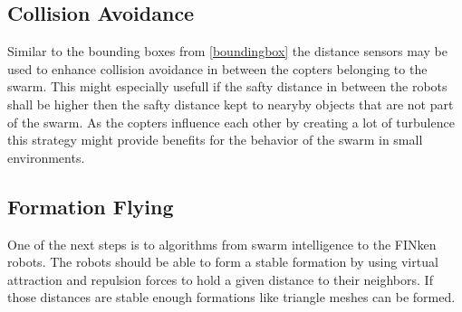 \subsection{Collision Avoidance}
Similar to the bounding boxes from \autoref{boundingbox} the distance sensors may be used to enhance collision avoidance in between the copters belonging to the swarm.
This might especially usefull if the safty distance in between the robots shall be higher then the safty distance kept to nearyby objects that are not part of the swarm.
As the copters influence each other by creating a lot of turbulence this strategy might provide benefits for the behavior of the swarm in small environments.

\subsection{Formation Flying}
One of the next steps is to  algorithms from swarm intelligence to the FINken robots.
The robots should be able to form a stable formation by using virtual attraction and repulsion forces to hold a given distance to their neighbors.
If those distances are stable enough formations like triangle meshes can be formed.

